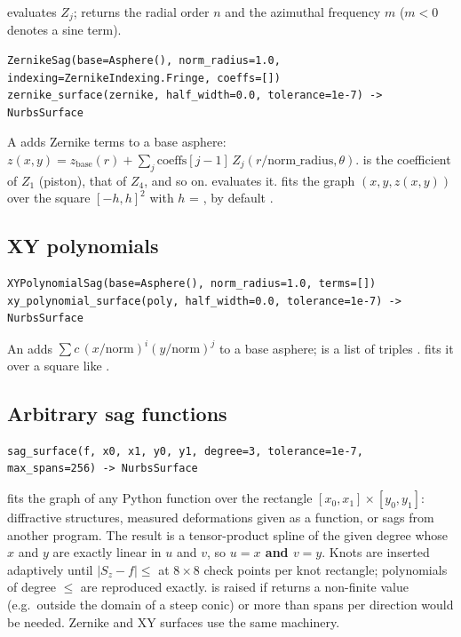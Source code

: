  evaluates $Z_j$;
 returns the radial order $n$ and the azimuthal frequency
$m$ ($m < 0$ denotes a sine term).

\begin{lstlisting}[style=text]
ZernikeSag(base=Asphere(), norm_radius=1.0, indexing=ZernikeIndexing.Fringe, coeffs=[])
zernike_surface(zernike, half_width=0.0, tolerance=1e-7) -> NurbsSurface
\end{lstlisting}

A  adds Zernike terms to a base asphere:
$z(x,y) = z_\text{base}(r) + \sum_j \text{coeffs}[j-1]\, Z_j(r/\text{norm\_radius}, \theta)$.
 is the coefficient of $Z_1$ (piston),  that of $Z_4$, and so
on.  evaluates it.  fits the graph $(x, y, z(x,y))$ over
the square $[-h, h]^2$ with $h$ = , by default .

\subsection{XY polynomials}

\begin{lstlisting}[style=text]
XYPolynomialSag(base=Asphere(), norm_radius=1.0, terms=[])
xy_polynomial_surface(poly, half_width=0.0, tolerance=1e-7) -> NurbsSurface
\end{lstlisting}

An  adds $\sum c\,(x/\text{norm})^i (y/\text{norm})^j$ to a base
asphere;  is a list of triples . 
fits it over a square like .

\subsection{Arbitrary sag functions}

\begin{lstlisting}[style=text]
sag_surface(f, x0, x1, y0, y1, degree=3, tolerance=1e-7, max_spans=256) -> NurbsSurface
\end{lstlisting}

 fits the graph of any Python function  over the rectangle
$[x_0,x_1]\times[y_0,y_1]$: diffractive structures, measured deformations given as a function,
or sags from another program. The result is a tensor-product spline of the given degree whose
$x$ and $y$ are exactly linear in $u$ and $v$, so \textbf{$u = x$ and $v = y$}. Knots are
inserted adaptively until $|S_z - f| \le$  at $8\times8$ check points per knot
rectangle; polynomials of degree $\le$  are reproduced exactly. 
is raised if  returns a non-finite value (e.g.\ outside the domain of a steep conic) or
more than  spans per direction would be needed. Zernike and XY surfaces use the
same machinery.

